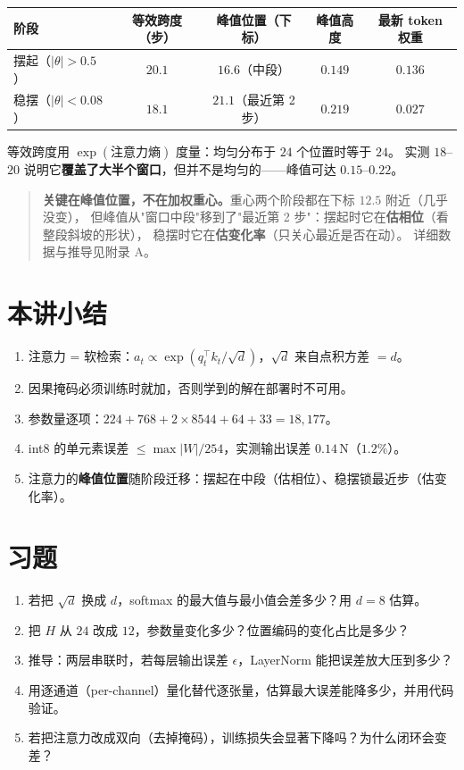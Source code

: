 \begin{center}
\small
\begin{tabular}{@{}lcccc@{}}
\toprule
阶段 & 等效跨度（步） & \textbf{峰值位置}（下标） & 峰值高度 & 最新 token 权重 \\
\midrule
摆起（$|\theta|>0.5$） & $20.1$ & $16.6$（中段） & $0.149$ & $0.136$ \\
稳摆（$|\theta|<0.08$） & $18.1$ & $21.1$（最近第 2 步） & $0.219$ & $0.027$ \\
\bottomrule
\end{tabular}
\end{center}

等效跨度用 $\exp(\text{注意力熵})$ 度量：均匀分布于 $24$ 个位置时等于 $24$。
实测 $18$--$20$ 说明它\textbf{覆盖了大半个窗口}，但并不是均匀的——峰值可达 $0.15$--$0.22$。

\begin{quote}
\textbf{关键在峰值位置，不在加权重心。}重心两个阶段都在下标 $12.5$ 附近（几乎没变），
但峰值从"窗口中段"移到了"最近第 2 步"：摆起时它在\textbf{估相位}（看整段斜坡的形状），
稳摆时它在\textbf{估变化率}（只关心最近是否在动）。
详细数据与推导见附录 A。
\end{quote}

\section{本讲小结}
\begin{enumerate}[leftmargin=2em,itemsep=2pt]
  \item 注意力 = 软检索：$a_t\propto\exp(q_t^\top k_t/\sqrt d)$，$\sqrt d$ 来自点积方差 $=d$。
  \item 因果掩码必须训练时就加，否则学到的解在部署时不可用。
  \item 参数量逐项：$224+768+2\times8544+64+33=18{,}177$。
  \item int8 的单元素误差 $\le\max|W|/254$，实测输出误差 $0.14$\,N（$1.2\%$）。
  \item 注意力的\textbf{峰值位置}随阶段迁移：摆起在中段（估相位）、稳摆锁最近步（估变化率）。
\end{enumerate}

\section*{习题}
\begin{enumerate}[leftmargin=2em,itemsep=6pt]
  \item 若把 $\sqrt d$ 换成 $d$，softmax 的最大值与最小值会差多少？用 $d=8$ 估算。
  \item 把 $H$ 从 $24$ 改成 $12$，参数量变化多少？位置编码的变化占比是多少？
  \item 推导：两层串联时，若每层输出误差 $\epsilon$，LayerNorm 能把误差放大压到多少？
  \item 用逐通道（per-channel）量化替代逐张量，估算最大误差能降多少，并用代码验证。
  \item 若把注意力改成双向（去掉掩码），训练损失会显著下降吗？为什么闭环会变差？
\end{enumerate}

